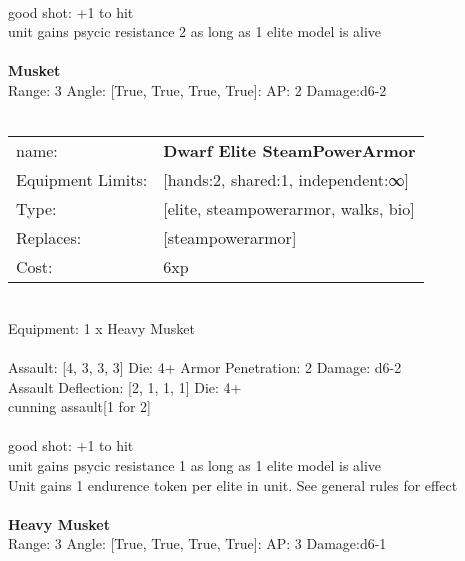 \ \\
good shot: +1 to hit\\ 
unit gains psycic resistance 2 as long as 1 elite model is alive\\ 

\ \\
{\bf Musket } \\



Range: 3  Angle: [True, True, True, True]: AP: 2 Damage:d6-2 \\




 
\ \\

\noindent
\begin{tabular}{ll}
name: &{\bf Dwarf Elite SteamPowerArmor } \\
Equipment Limits: &[hands:2, shared:1, independent:∞] \\
Type: &[elite, steampowerarmor, walks, bio] \\
Replaces: &[steampowerarmor] \\
Cost: & 6xp\\
\end{tabular}
\ \\
Equipment: 1 x Heavy Musket \\
\ \\
Assault: [4, 3, 3, 3] Die: 4+ Armor Penetration: 2 Damage: d6-2 \\
Assault Deflection: [2, 1, 1, 1] Die: 4+\\
\indent cunning assault[1 for 2]\\ 
 
\ \\
good shot: +1 to hit\\ 
unit gains psycic resistance 1 as long as 1 elite model is alive\\ 
Unit gains 1 endurence token per elite in unit. See general rules for effect\\ 

\ \\
{\bf Heavy Musket } \\



Range: 3  Angle: [True, True, True, True]: AP: 3 Damage:d6-1 \\




 
\ \\

